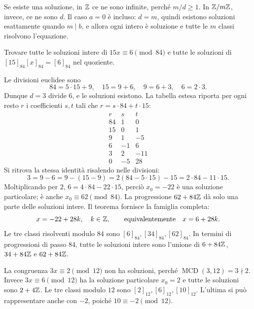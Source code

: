\begin{osservazione}
Se esiste una soluzione, in $\mathbb{Z}$ ce ne sono infinite, perché $m/d\ge1$. In $\mathbb{Z}/m\mathbb{Z}$, invece, ce ne sono $d$. Il caso $a=0$ è incluso: $d=m$, quindi esistono soluzioni esattamente quando $m\mid b$, e allora ogni intero è soluzione e tutte le $m$ classi risolvono l'equazione.
\end{osservazione}

\begin{esercizio}
Trovare tutte le soluzioni intere di $15x\equiv6\pmod{84}$ e tutte le soluzioni di $[15]_{84}[x]_{84}=[6]_{84}$ nel quoziente.
\end{esercizio}
\begin{svolgimento}
Le divisioni euclidee sono
\[
84=5\cdot15+9,\quad 15=9+6,\quad 9=6+3,\quad 6=2\cdot3.
\]
Dunque $d=3$ divide $6$, e le soluzioni esistono. La tabella estesa riporta per ogni resto $r$ i coefficienti $s,t$ tali che $r=s\cdot84+t\cdot15$:
\[
\begin{array}{r|r|r}
r&s&t\\\hline
84&1&0\\15&0&1\\9&1&-5\\6&-1&6\\3&2&-11\\0&-5&28
\end{array}
\]
Si ritrova la stessa identità risalendo nelle divisioni:
\[
3=9-6=9-(15-9)=2(84-5\cdot15)-15=2\cdot84-11\cdot15.
\]
Moltiplicando per $2$, $6=4\cdot84-22\cdot15$, perciò $x_0=-22$ è una soluzione particolare; è anche $x_0\equiv62\pmod{84}$. La progressione $62+84\mathbb{Z}$ dà solo una parte delle soluzioni intere. Il teorema fornisce la famiglia completa:
\[
x=-22+28k,\quad k\in\mathbb{Z},\qquad\text{equivalentemente}\quad x=6+28k.
\]
Le tre classi risolventi modulo $84$ sono $[6]_{84},[34]_{84},[62]_{84}$. In termini di progressioni di passo $84$, tutte le soluzioni intere sono l'unione di $6+84\mathbb{Z}$, $34+84\mathbb{Z}$ e $62+84\mathbb{Z}$.
\end{svolgimento}

\begin{esempio}
La congruenza $3x\equiv2\pmod{12}$ non ha soluzioni, perché $\operatorname{MCD}(3,12)=3\nmid2$. Invece $3x\equiv6\pmod{12}$ ha la soluzione particolare $x_0=2$ e tutte le soluzioni sono $2+4\mathbb{Z}$. Le tre classi modulo $12$ sono $[2]_{12},[6]_{12},[10]_{12}$. L'ultima si può rappresentare anche con $-2$, poiché $10\equiv-2\pmod{12}$.
\end{esempio}

